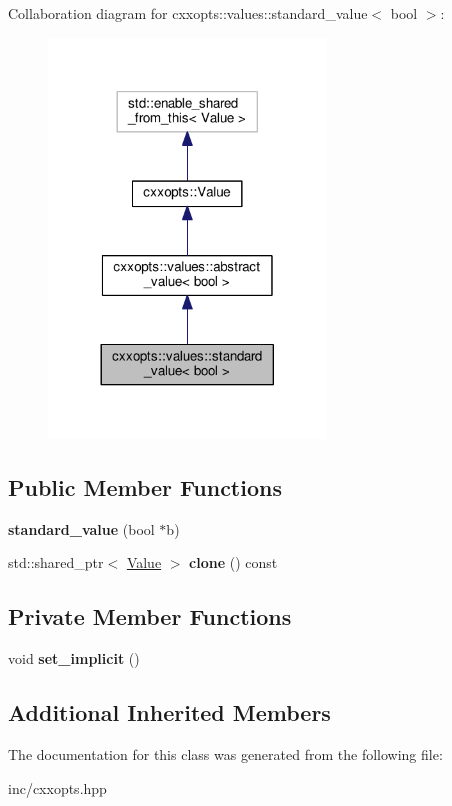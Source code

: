 Collaboration diagram for cxxopts\+:\+:values\+:\+:standard\+\_\+value$<$ bool $>$\+:
\nopagebreak
\begin{figure}[H]
\begin{center}
\leavevmode
\includegraphics[width=209pt]{classcxxopts_1_1values_1_1standard__value_3_01bool_01_4__coll__graph}
\end{center}
\end{figure}
\subsection*{Public Member Functions}
\begin{DoxyCompactItemize}
\item 
{\bfseries standard\+\_\+value} (bool $\ast$b)\hypertarget{classcxxopts_1_1values_1_1standard__value_3_01bool_01_4_aa5c0c7c48a5f27ef5ce821970a0ced94}{}\label{classcxxopts_1_1values_1_1standard__value_3_01bool_01_4_aa5c0c7c48a5f27ef5ce821970a0ced94}

\item 
std\+::shared\+\_\+ptr$<$ \hyperlink{classcxxopts_1_1Value}{Value} $>$ {\bfseries clone} () const \hypertarget{classcxxopts_1_1values_1_1standard__value_3_01bool_01_4_ae80a215ab7e29c87183f3ec1b2d9f408}{}\label{classcxxopts_1_1values_1_1standard__value_3_01bool_01_4_ae80a215ab7e29c87183f3ec1b2d9f408}

\end{DoxyCompactItemize}
\subsection*{Private Member Functions}
\begin{DoxyCompactItemize}
\item 
void {\bfseries set\+\_\+implicit} ()\hypertarget{classcxxopts_1_1values_1_1standard__value_3_01bool_01_4_a7eb5b0f9b27798f4a60063764f7880df}{}\label{classcxxopts_1_1values_1_1standard__value_3_01bool_01_4_a7eb5b0f9b27798f4a60063764f7880df}

\end{DoxyCompactItemize}
\subsection*{Additional Inherited Members}


The documentation for this class was generated from the following file\+:\begin{DoxyCompactItemize}
\item 
inc/cxxopts.\+hpp\end{DoxyCompactItemize}
